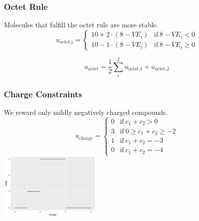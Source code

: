 \documentclass[xcolor=dvipsnames]{beamer}
\begin{document}
\begin{frame}
\frametitle{Octet Rule}
Molecules that fulfill the octet rule are more stable.
\begin{equation}
u_{\textrm{octet,i}} = 
\begin{cases}
 10 + 2 \cdot (8-VE_i) 	& \mathrm{if}~ 8-VE_i < 0 \\
 10 - 1 \cdot (8-VE_i) 	& \mathrm{if}~ 8-VE_i \geq 0
\end{cases}
\end{equation}

\begin{equation}
u_{\textrm{octet}} = \frac{1}{2} \sum_i^2 u_{\textrm{octet,1}} + u_{\textrm{octet,2}} 
\end{equation}


\end{frame}

\begin{frame}
\frametitle{Charge Constraints}
We reward only mildly negatively charged compounds.
\begin{equation}
u_{\textrm{charge}} = 
\begin{cases}
0	&	\mathrm{if}~ c_1 + c_2 > 0 \\
3	&	\mathrm{if}~ 0 \geq c_1 + c_2 \geq -2 \\
1   &	\mathrm{if}~ c_1 + c_2 = -3 \\
0   &	\mathrm{if}~ c_1 + c_2 = -4 
\end{cases}
\end{equation}
\includegraphics[width=5cm]{img/charge.pdf}
\centering
\end{frame}
\end{document}
